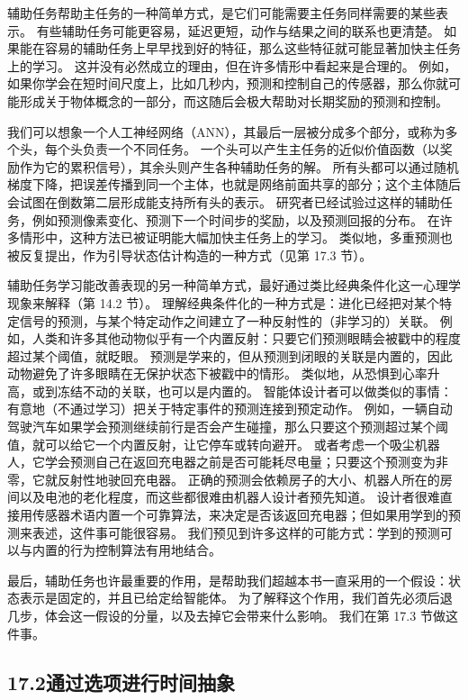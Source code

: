 \documentclass[UTF8,12pt,a4paper,fontset=fandol]{ctexart}
\begin{document}
辅助任务帮助主任务的一种简单方式，是它们可能需要主任务同样需要的某些表示。
有些辅助任务可能更容易，延迟更短，动作与结果之间的联系也更清楚。
如果能在容易的辅助任务上早早找到好的特征，那么这些特征就可能显著加快主任务上的学习。
这并没有必然成立的理由，但在许多情形中看起来是合理的。
例如，如果你学会在短时间尺度上，比如几秒内，预测和控制自己的传感器，那么你就可能形成关于物体概念的一部分，而这随后会极大帮助对长期奖励的预测和控制。

我们可以想象一个人工神经网络（ANN），其最后一层被分成多个部分，或称为多个头，每个头负责一个不同任务。
一个头可以产生主任务的近似价值函数（以奖励作为它的累积信号），其余头则产生各种辅助任务的解。
所有头都可以通过随机梯度下降，把误差传播到同一个主体，也就是网络前面共享的部分；这个主体随后会试图在倒数第二层形成能支持所有头的表示。
研究者已经试验过这样的辅助任务，例如预测像素变化、预测下一个时间步的奖励，以及预测回报的分布。
在许多情形中，这种方法已被证明能大幅加快主任务上的学习。
类似地，多重预测也被反复提出，作为引导状态估计构造的一种方式（见第 17.3 节）。

辅助任务学习能改善表现的另一种简单方式，最好通过类比经典条件化这一心理学现象来解释（第 14.2 节）。
理解经典条件化的一种方式是：进化已经把对某个特定信号的预测，与某个特定动作之间建立了一种反射性的（非学习的）关联。
例如，人类和许多其他动物似乎有一个内置反射：只要它们预测眼睛会被戳中的程度超过某个阈值，就眨眼。
预测是学来的，但从预测到闭眼的关联是内置的，因此动物避免了许多眼睛在无保护状态下被戳中的情形。
类似地，从恐惧到心率升高，或到冻结不动的关联，也可以是内置的。
智能体设计者可以做类似的事情：有意地（不通过学习）把关于特定事件的预测连接到预定动作。
例如，一辆自动驾驶汽车如果学会预测继续前行是否会产生碰撞，那么只要这个预测超过某个阈值，就可以给它一个内置反射，让它停车或转向避开。
或者考虑一个吸尘机器人，它学会预测自己在返回充电器之前是否可能耗尽电量；只要这个预测变为非零，它就反射性地驶回充电器。
正确的预测会依赖房子的大小、机器人所在的房间以及电池的老化程度，而这些都很难由机器人设计者预先知道。
设计者很难直接用传感器术语内置一个可靠算法，来决定是否该返回充电器；但如果用学到的预测来表述，这件事可能很容易。
我们预见到许多这样的可能方式：学到的预测可以与内置的行为控制算法有用地结合。

最后，辅助任务也许最重要的作用，是帮助我们超越本书一直采用的一个假设：状态表示是固定的，并且已给定给智能体。
为了解释这个作用，我们首先必须后退几步，体会这一假设的分量，以及去掉它会带来什么影响。
我们在第 17.3 节做这件事。

\subsection*{17.2\quad 通过选项进行时间抽象}
\end{document}
